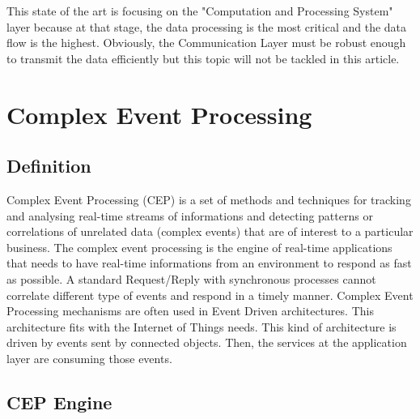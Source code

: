 \documentclass[11pt]{article}
\begin{document}
This state of the art is focusing on the "Computation and Processing System" layer because at that stage, the data processing is the most critical and the data flow is the highest. Obviously, the Communication Layer must be robust enough to transmit the data efficiently but this topic will not be tackled in this article.


\section{Complex Event Processing}

\subsection{Definition}

Complex Event Processing (CEP) is a set of methods and techniques for tracking
and analysing real-time streams of informations and detecting patterns or correlations
of unrelated data (complex events) that are of interest to a particular
business. \cite{1} The complex event processing is the engine of real-time applications that needs to have real-time informations from an environment to respond as fast as possible. A standard Request/Reply with synchronous processes cannot correlate different type of events and respond in a timely manner. Complex Event Processing mechanisms are often used in Event Driven architectures. This architecture fits with the Internet of Things needs. This kind of architecture is driven by events sent by connected objects. Then, the services at the application layer are consuming those events.

\subsection{CEP Engine}
\end{document}
